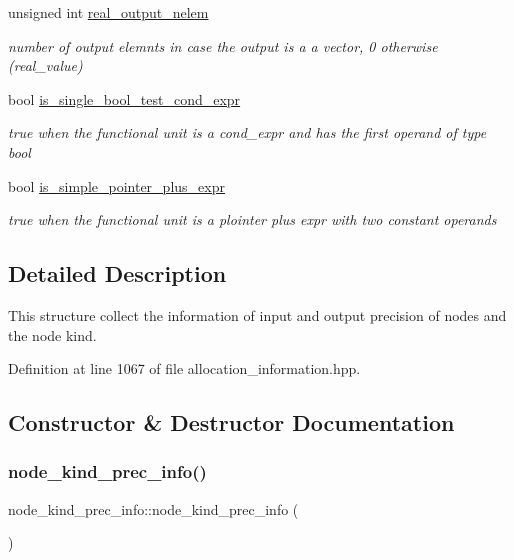 \begin{DoxyCompactItemize}
unsigned int \hyperlink{structnode__kind__prec__info_aed753065e0a822708af51c0a3b004634}{real\+\_\+output\+\_\+nelem}
\begin{DoxyCompactList}\small\item\em number of output elemnts in case the output is a a vector, 0 otherwise (real\+\_\+value) \end{DoxyCompactList}\item 
bool \hyperlink{structnode__kind__prec__info_ae55d5873edaee7194ef99b7e7dd4eab8}{is\+\_\+single\+\_\+bool\+\_\+test\+\_\+cond\+\_\+expr}
\begin{DoxyCompactList}\small\item\em true when the functional unit is a cond\+\_\+expr and has the first operand of type bool \end{DoxyCompactList}\item 
bool \hyperlink{structnode__kind__prec__info_abb84f133e84a485a5bf9f187de61547f}{is\+\_\+simple\+\_\+pointer\+\_\+plus\+\_\+expr}
\begin{DoxyCompactList}\small\item\em true when the functional unit is a plointer plus expr with two constant operands \end{DoxyCompactList}\end{DoxyCompactItemize}


\subsection{Detailed Description}
This structure collect the information of input and output precision of nodes and the node kind. 

Definition at line 1067 of file allocation\+\_\+information.\+hpp.



\subsection{Constructor \& Destructor Documentation}
\mbox{\label{structnode__kind__prec__info_a0e501c2bbd263082feda660fe26a983f}} 
\subsubsection{\texorpdfstring{node\+\_\+kind\+\_\+prec\+\_\+info()}{node\_kind\_prec\_info()}}
{\footnotesize\ttfamily node\+\_\+kind\+\_\+prec\+\_\+info\+::node\+\_\+kind\+\_\+prec\+\_\+info (\begin{DoxyParamCaption}{ }\end{DoxyParamCaption})\hspace{0.3cm}{\ttfamily [inline]}}




